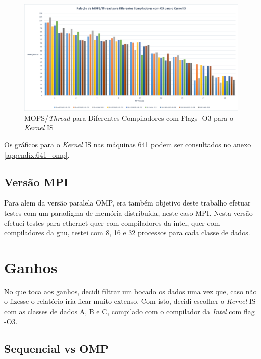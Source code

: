 \documentclass[conference,compsoc]{IEEEtran}
\begin{document}
\begin{figure}[h!]
\centering
\includegraphics[scale=0.225]{OMP/mops-thread_dif_comp-O3_IS_nodo-431.png}
\caption{MOPS/\textit{Thread} para Diferentes Compiladores com Flags -O3 para o \textit{Kernel} IS}
\label{fig:mops-thread_dif_comp_omp_O3_IS_431}
\end{figure}

Os gráficos para o \textit{Kernel} IS nas máquinas 641 podem ser consultados no anexo \ref{appendix:641_omp}.

\subsection{Versão MPI}
Para alem da versão paralela OMP, era também objetivo deste trabalho efetuar testes com um paradigma de memória distribuída, neste caso MPI. Nesta versão efetuei testes para ethernet quer com compiladores da intel, quer com compiladores da gnu, testei com 8, 16 e 32 processos para cada classe de dados.

\section{Ganhos}
No que toca aos ganhos, decidi filtrar um bocado os dados uma vez que, caso não o fizesse o relatório iria ficar muito extenso. Com isto, decidi escolher o \textit{Kernel} IS com as classes de dados A, B e C, compilado com o compilador da \textit{Intel} com flag -O3.

\subsection{Sequencial vs OMP}
\end{document}
